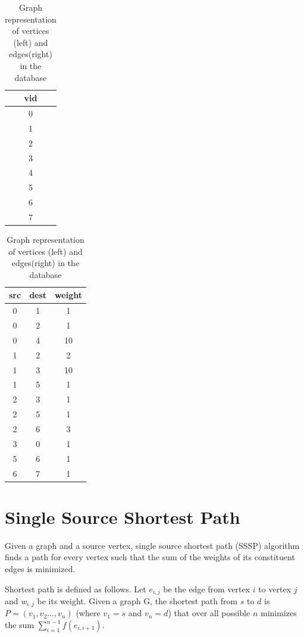 \begin{table}
  \begin{tabular}{| c | }
    \hline
    vid \\ \hline
    0 \\ \hline
    1 \\ \hline
    2 \\ \hline
    3 \\ \hline
    4 \\ \hline
    5 \\ \hline
    6 \\ \hline
    7 \\
    \hline
  \end{tabular}
  \quad
  \begin{tabular}{| c | c | c |}
    \hline
    src & dest & weight \\ \hline
    0 & 1 & 1 \\ \hline
    0 & 2 & 1 \\ \hline
    0 & 4 & 10 \\ \hline
    1 & 2 & 2 \\ \hline
    1 & 3 & 10 \\ \hline
    1 & 5 & 1 \\ \hline
    2 & 3 & 1 \\ \hline
    2 & 5 & 1 \\ \hline
    2 & 6 & 3 \\ \hline
    3 & 0 & 1 \\ \hline
    5 & 6 & 1 \\ \hline
    6 & 7 & 1 \\
    \hline
  \end{tabular}
  \caption{Graph representation of vertices (left) and edges(right) in the database}
  \label{sssp:rep}
\end{table}


\section{Single Source Shortest Path} \label{sec:graph:sssp}

Given a graph and a source vertex, single source shortest path (SSSP) algorithm finds a path for every vertex such that the sum of the weights of its constituent edges is minimized.

Shortest path is defined as follows. Let $e_{i,j}$ be the edge from vertex $i$ to vertex $j$ and $w_{i,j}$ be its weight. Given a graph G, the shortest path from $s$ to $d$ is $P = (v_1, v_2 \dots, v_n)$ (where $v_1=s$ and $v_n=d$) that over all possible $n$ minimizes the sum $ \sum _{i=1}^{n-1}f(e_{i,i+1})$.

